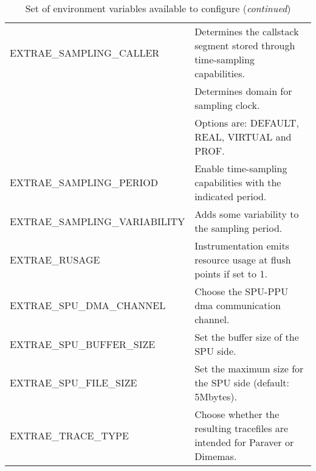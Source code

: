 \begin{landscape}
\begin{table}
{\begin{tabular}{p{7cm} p{14cm}}
  \cellcolor{tabbg1} EXTRAE\_SAMPLING\_CALLER & \cellcolor{tabbg1} Determines the callstack segment stored through time-sampling capabilities.\\
  \cellcolor{tabbg2} & \cellcolor{tabbg2} Determines domain for sampling clock.\\
  \cellcolor{tabbg2} \multirow{-2}{*}{EXTRAE\_SAMPLING\_CLOCKTYPE} & \cellcolor{tabbg2} Options are: DEFAULT, REAL, VIRTUAL and PROF.\\
  \cellcolor{tabbg1} EXTRAE\_SAMPLING\_PERIOD & \cellcolor{tabbg1} Enable time-sampling capabilities with the indicated period.\\
  \cellcolor{tabbg2} EXTRAE\_SAMPLING\_VARIABILITY & \cellcolor{tabbg2} Adds some variability to the sampling period.\\
  \cellcolor{tabbg1} EXTRAE\_RUSAGE & \cellcolor{tabbg1} Instrumentation emits resource usage at flush points if set to 1.\\
  \cellcolor{tabbg2} EXTRAE\_SPU\_DMA\_CHANNEL & \cellcolor{tabbg2} Choose the SPU-PPU dma communication channel.\\
  \cellcolor{tabbg1} EXTRAE\_SPU\_BUFFER\_SIZE & \cellcolor{tabbg1} Set the buffer size of the SPU side.\\
  \cellcolor{tabbg2} EXTRAE\_SPU\_FILE\_SIZE & \cellcolor{tabbg2} Set the maximum size for the SPU side (default: 5Mbytes).\\
  \cellcolor{tabbg1} EXTRAE\_TRACE\_TYPE & \cellcolor{tabbg1} Choose whether the resulting tracefiles are intended for Paraver or Dimemas.\\
  \hline
\end{tabular}
}
\caption{Set of environment variables available to configure \TRACE ({\em continued})}
\label{tab:EnvironmentVariables_continued}
\end{table}

\end{landscape}
